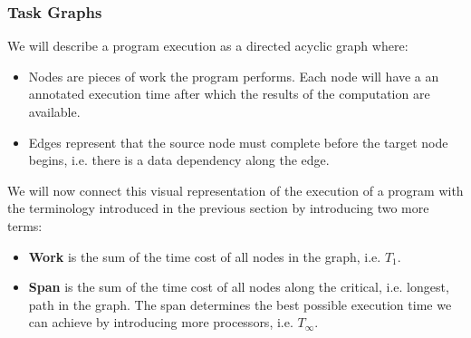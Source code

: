 \documentclass[main.tex]{subfiles}
\begin{document}
\subsubsection{Task Graphs} \label{Task Graphs}
We will describe a program execution as a directed acyclic graph where:
\begin{itemize}
    \item Nodes are pieces of work the program performs. Each node will have a an annotated execution time after which the results of the computation are available.
    \item Edges represent that the source node must complete before the target node begins, i.e. there is a data dependency along the edge.
\end{itemize}
We will now connect this visual representation of the execution of a program with the terminology introduced in the previous section by introducing two more terms:
\begin{itemize}
    \item \textbf{Work} is the sum of the time cost of all nodes in the graph, i.e. $T_1$.
    \item  \textbf{Span} is the sum of the time cost of all nodes along the critical, i.e. longest, path in the graph. The span determines the best possible execution time we can achieve by introducing more processors, i.e. $T_\infty$.
\end{itemize}
\end{document}
